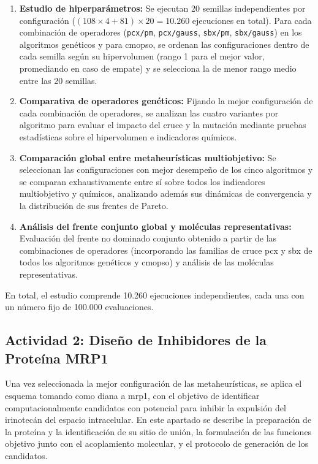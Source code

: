 \begin{enumerate}
    \item \textbf{Estudio de hiperparámetros:} Se ejecutan 20 semillas independientes por configuración ($(108 \times 4 + 81) \times 20 = \text{10.260}$ ejecuciones en total). Para cada combinación de operadores (\texttt{pcx/pm}, \texttt{pcx/gauss}, \texttt{sbx/pm}, \texttt{sbx/gauss}) en los algoritmos genéticos y para \acrshort{cmopso}, se ordenan las configuraciones dentro de cada semilla según su hipervolumen (rango 1 para el mejor valor, promediando en caso de empate) y se selecciona la de menor rango medio entre las 20 semillas.
    \item \textbf{Comparativa de operadores genéticos:} Fijando la mejor configuración de cada combinación de operadores, se analizan las cuatro variantes por algoritmo para evaluar el impacto del cruce y la mutación mediante pruebas estadísticas sobre el hipervolumen e indicadores químicos.
    \item \textbf{Comparación global entre metaheurísticas multiobjetivo:} Se seleccionan las configuraciones con mejor desempeño de los cinco algoritmos y se comparan exhaustivamente entre sí sobre todos los indicadores multiobjetivo y químicos, analizando además sus dinámicas de convergencia y la distribución de sus frentes de Pareto.
    \item \textbf{Análisis del frente conjunto global y moléculas representativas:} Evaluación del frente no dominado conjunto obtenido a partir de las combinaciones de operadores (incorporando las familias de cruce \acrshort{pcx} y \acrshort{sbx} de todos los algoritmos genéticos y \acrshort{cmopso}) y análisis de las moléculas representativas.
\end{enumerate}

En total, el estudio comprende 10.260 ejecuciones independientes, cada una con un número fijo de 100.000 evaluaciones.

\subsection{Actividad 2: Diseño de Inhibidores de la Proteína MRP1}
\label{sec:fase2_mrp1}
\label{sec:diseno_inhibidores_mrp1}

Una vez seleccionada la mejor configuración de las metaheurísticas, se aplica el esquema tomando como diana a \gls{mrp1}, con el objetivo de identificar computacionalmente candidatos con potencial para inhibir la expulsión del irinotecán del espacio intracelular. En este apartado se describe la preparación de la proteína y la identificación de su sitio de unión, la formulación de las funciones objetivo junto con el acoplamiento molecular, y el protocolo de generación de los candidatos.

